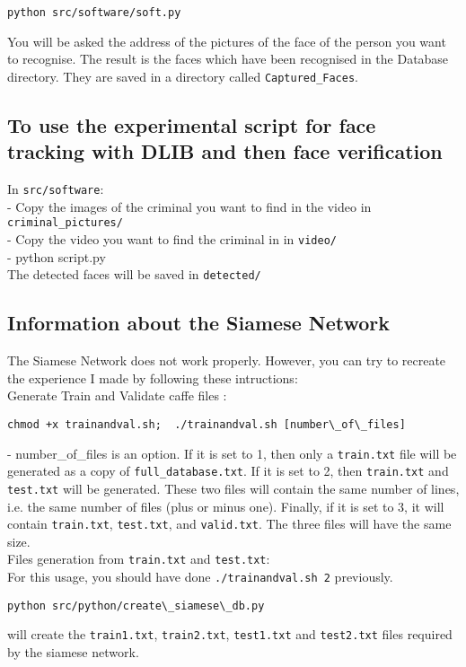 \begin{verbatim}
python src/software/soft.py
\end{verbatim}
You will be asked the address of the pictures of the face of the person you want to recognise. The result is the faces which have been recognised in the Database directory. They are saved in a directory called \texttt{Captured\_Faces}.


\subsection{To use the experimental script for face tracking with DLIB and then face verification}

In \texttt{src/software}:\\
- Copy the images of the criminal you want to find in the video in \texttt{criminal\_pictures/}\\
- Copy the video you want to find the criminal in in \texttt{video/}\\
- python script.py\\

The detected faces will be saved in \texttt{detected/}

\subsection{Information about the Siamese Network}

The Siamese Network does not work properly. However, you can try to recreate the experience I made by following these intructions:\\

Generate Train and Validate caffe files : 
\begin{verbatim}
chmod +x trainandval.sh;  ./trainandval.sh [number\_of\_files]
\end{verbatim}
- number\_of\_files is an option. If it is set to 1, then only a \texttt{train.txt} file will be generated as a copy of \texttt{full\_database.txt}. If it is set to 2, then \texttt{train.txt} and \texttt{test.txt} will be generated. These two files will contain the same number of lines, i.e. the same number of files (plus or minus one). Finally, if it is set to 3, it will contain \texttt{train.txt}, \texttt{test.txt}, and \texttt{valid.txt}. The three files will have the same size.\\

Files generation from \texttt{train.txt} and \texttt{test.txt}:\\
For this usage, you should have done \texttt{./trainandval.sh 2} previously.\\
\begin{verbatim}
python src/python/create\_siamese\_db.py
\end{verbatim}
will create the \texttt{train1.txt}, \texttt{train2.txt}, \texttt{test1.txt} and \texttt{test2.txt} files required by the siamese network.

